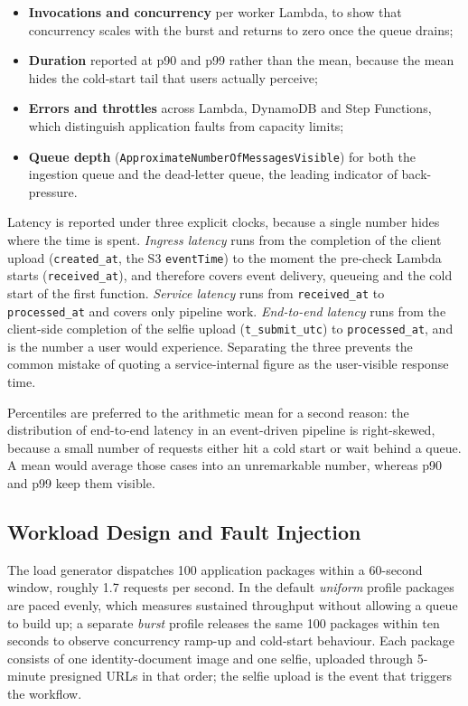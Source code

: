 \begin{itemize}
  \item \textbf{Invocations and concurrency} per worker Lambda, to show that
        concurrency scales with the burst and returns to zero once the queue
        drains;
  \item \textbf{Duration} reported at p90 and p99 rather than the mean, because
        the mean hides the cold-start tail that users actually perceive;
  \item \textbf{Errors and throttles} across Lambda, DynamoDB and Step
        Functions, which distinguish application faults from capacity limits;
  \item \textbf{Queue depth} (\texttt{ApproximateNumberOfMessagesVisible}) for
        both the ingestion queue and the dead-letter queue, the leading
        indicator of back-pressure.
\end{itemize}

Latency is reported under three explicit clocks, because a single number hides
where the time is spent. \emph{Ingress latency} runs from the completion of the
client upload (\texttt{created\_at}, the S3 \texttt{eventTime}) to the moment
the pre-check Lambda starts (\texttt{received\_at}), and therefore covers event
delivery, queueing and the cold start of the first function. \emph{Service
latency} runs from \texttt{received\_at} to \texttt{processed\_at} and covers
only pipeline work. \emph{End-to-end latency} runs from the client-side
completion of the selfie upload (\texttt{t\_submit\_utc}) to
\texttt{processed\_at}, and is the number a user would experience. Separating
the three prevents the common mistake of quoting a service-internal figure as the
user-visible response time.

Percentiles are preferred to the arithmetic mean for a second reason: the
distribution of end-to-end latency in an event-driven pipeline is right-skewed,
because a small number of requests either hit a cold start or wait behind a
queue. A mean would average those cases into an unremarkable number, whereas p90
and p99 keep them visible.

\subsection{Workload Design and Fault Injection}\label{sec:workload}

The load generator dispatches 100 application packages within a 60-second
window, roughly 1.7 requests per second. In the default \emph{uniform} profile
packages are paced evenly, which measures sustained throughput without allowing
a queue to build up; a separate \emph{burst} profile releases the same 100
packages within ten seconds to observe concurrency ramp-up and cold-start
behaviour. Each package consists of one identity-document image and one selfie,
uploaded through 5-minute presigned URLs in that order; the selfie upload is the
event that triggers the workflow.

